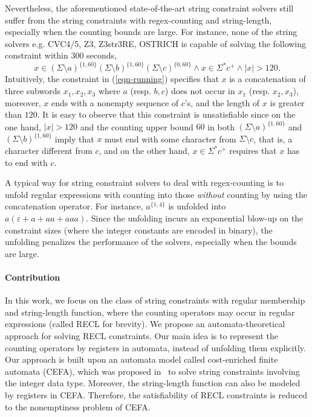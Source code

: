 Nevertheless, the aforementioned state-of-the-art string constraint solvers still suffer from the string constraints with regex-counting and string-length, especially when the counting bounds are large. For instance, none of the string solvers e.g. CVC4/5, Z3, Z3str3RE, OSTRICH is capable of solving the following constraint within 300 seconds,
%
\begin{equation}\label{eqn-running}
x \in (\Sigma \setminus a)^{\{1, 60\}} (\Sigma \setminus b)^{\{1, 60\}} (\Sigma \setminus c)^{\{0, 60\}} \wedge x \in \Sigma^* c^+ \wedge |x| > 120.
\end{equation}
Intuitively, the constraint in (\ref{eqn-running}) specifies that $x$ is a concatenation of three subwords $x_1, x_2, x_3$ where $a$ (resp. $b, c$) does not occur in $x_1$ (resp. $x_2, x_3$), moreover, $x$ ends with a nonempty sequence of $c$'s, and the length of $x$ is greater than $120$. It is easy to observe that this constraint is unsatisfiable since on the one hand, $|x| > 120$ and the counting upper bound $60$ in both $(\Sigma \setminus a)^{\{1, 60\}}$ and $(\Sigma \setminus b)^{\{1, 60\}}$ imply that $x$ must end with some character from $\Sigma \setminus c$, that is, a character different from $c$, and on the other hand, $x \in \Sigma^*c^+$ requires that $x$ has to end with $c$.

A typical way for string constraint solvers to deal with regex-counting is to unfold regular expressions with counting into those \emph{without} counting by using the concatenation operator. For instance, $a^{\{1, 4\}}$ is unfolded into $a(\varepsilon + a + aa + aaa)$. Since the unfolding incurs an exponential blow-up on the constraint sizes (where the integer constants are encoded in binary), the unfolding penalizes the performance of the solvers, especially when the bounds are large. 


\paragraph*{Contribution} In this work, we focus on the class of string constraints with regular membership and string-length function, where the counting operators may occur in regular expressions (called RECL for brevity). We propose an automata-theoretical approach for solving RECL constraints. Our main idea is to represent the counting operators by registers in automata, instead of unfolding them explicitly. Our approach is built upon an automata model called cost-enriched finite automata (CEFA), which was proposed in~\cite{atva2020} to solve string constraints involving the integer data type. Moreover, the string-length function can also be modeled by registers in CEFA. Therefore, the satisfiability of RECL constraints is reduced to the nonemptiness problem of CEFA. 

